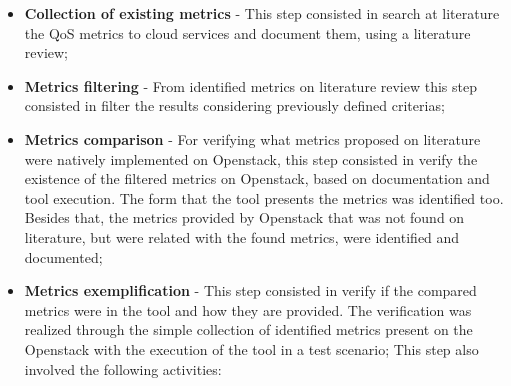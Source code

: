 \documentclass[conference]{IEEEtran}
\begin{document}
\begin{itemize}
 
 \item \textbf{Collection of existing metrics} - This step consisted in search at literature the QoS metrics to cloud services and document them, using a literature review;

  
 \item \textbf{Metrics filtering} - From identified metrics on literature review this step consisted in
 filter the results considering previously defined criterias;



  \item \textbf{Metrics comparison} - For verifying what metrics proposed on literature were natively implemented on Openstack, this step consisted in verify the existence of the filtered metrics on Openstack, based on documentation and tool execution. The form that the tool presents the metrics was identified too. Besides that, the metrics provided by Openstack that was not found on literature, but were related with the found metrics, were identified and documented;
 
 \item \textbf{Metrics exemplification} - This step consisted in verify if the compared metrics were in
 the tool and how they are provided. The verification was realized through the simple collection of identified metrics present on the Openstack with the execution of the tool in a test scenario;
 This step also involved the following activities:


\end{itemize}
\end{document}

